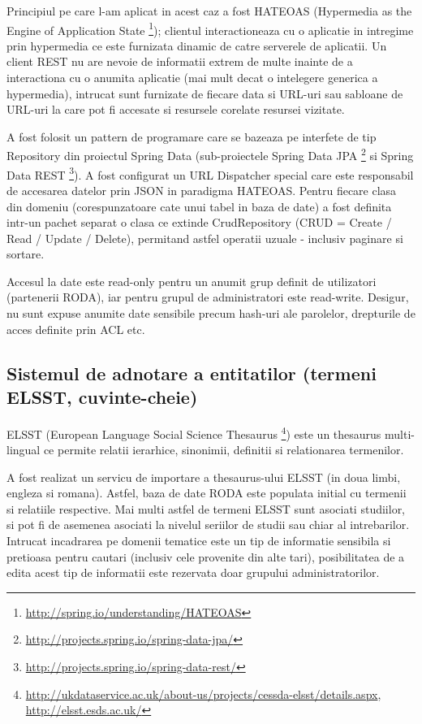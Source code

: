 \documentclass[a4paper, 10pt]{article}
\begin{document}
{Principiul pe care l-am aplicat in acest caz a fost HATEOAS (Hypermedia as the Engine of Application State   \footnote{\url{ http://spring.io/understanding/HATEOAS}});
clientul interactioneaza cu o aplicatie in intregime prin hypermedia ce este furnizata dinamic de catre serverele de aplicatii.
Un client REST nu are nevoie de informatii extrem de multe inainte de a interactiona cu o anumita aplicatie (mai mult decat o intelegere generica a hypermedia), 
intrucat sunt furnizate de fiecare data si URL-uri sau sabloane de URL-uri la care pot fi accesate si resursele corelate resursei vizitate.

A fost folosit un pattern de programare care se bazeaza pe interfete de tip Repository 
din proiectul Spring Data (sub-proiectele Spring Data JPA \footnote{\url{http://projects.spring.io/spring-data-jpa/}} si Spring Data REST \footnote{\url{http://projects.spring.io/spring-data-rest/}}). 
A fost configurat un URL Dispatcher special care este responsabil de accesarea datelor prin JSON in paradigma HATEOAS. 
Pentru fiecare clasa din domeniu (corespunzatoare cate unui tabel in baza de date) 
a fost definita intr-un pachet separat o clasa ce extinde CrudRepository (CRUD = Create / Read / Update / Delete), 
permitand astfel operatii uzuale - inclusiv paginare si sortare.

Accesul la date este read-only pentru un anumit grup definit de utilizatori (partenerii RODA), 
iar pentru grupul de administratori este read-write. 
Desigur, nu sunt expuse anumite date sensibile precum hash-uri ale parolelor, drepturile de acces definite prin ACL etc.

\subsection{Sistemul de adnotare a entitatilor (termeni ELSST, cuvinte-cheie)}

ELSST (European Language Social Science Thesaurus \footnote{\url{http://ukdataservice.ac.uk/about-us/projects/cessda-elsst/details.aspx}, \url{http://elsst.esds.ac.uk/}}) 
este un thesaurus multi-lingual ce permite relatii ierarhice, sinonimii, definitii si relationarea termenilor.

A fost realizat un servicu de importare a thesaurus-ului ELSST (in doua limbi, engleza si romana). 
Astfel, baza de date RODA este populata initial cu termenii si relatiile respective.
Mai multi astfel de termeni ELSST sunt asociati studiilor, 
si pot fi de asemenea asociati la nivelul seriilor de studii sau chiar al intrebarilor.
Intrucat incadrarea pe domenii tematice este un tip de informatie sensibila si pretioasa pentru cautari 
(inclusiv cele provenite din alte tari),
posibilitatea de a edita acest tip de informatii este rezervata doar grupului administratorilor.

}
\end{document}
